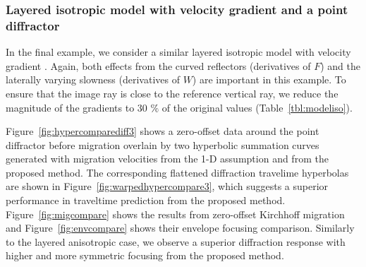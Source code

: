 \subsubsection{Layered isotropic model with velocity gradient and a point diffractor}

In the final example, we consider a similar layered isotropic model with velocity gradient . Again, both effects from the curved reflectors (derivatives of $F$) and the laterally varying slowness (derivatives of $W$) are important in this example. To ensure that the image ray is close to the reference vertical ray, we reduce the magnitude of the gradients to 30 $\%$ of the original values (Table~\ref{tbl:modeliso}). 




Figure~\ref{fig:hypercomparediff3} shows a zero-offset data around the point diffractor before migration overlain by two hyperbolic summation curves generated with migration velocities from the 1-D assumption and from the proposed method. The corresponding flattened diffraction travelime hyperbolas are shown in Figure~\ref{fig:warpedhypercompare3}, which suggests a superior performance in traveltime prediction from the proposed method. Figure~\ref{fig:migcompare} shows the results from zero-offset Kirchhoff migration and Figure~\ref{fig:envcompare} shows their envelope focusing comparison. Similarly to the layered anisotropic case, we observe a superior diffraction response with higher and more symmetric focusing from the proposed method.

